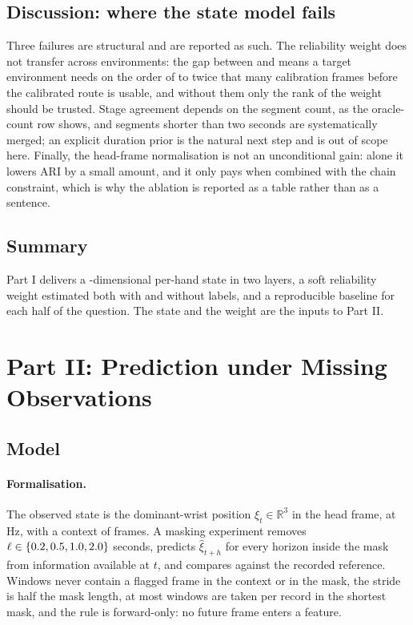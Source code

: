\documentclass{swmcmthesis}
\begin{document}
\subsection{Discussion: where the state model fails}
\label{sec:pone_discussion}
\label{sec:p1disc}

Three failures are structural and are reported as such. The reliability weight
does not transfer across environments: the gap between \slotPEnvOneAUC{} and
\slotPEnvTwoAUC{} means a target environment needs on the order of
\slotCtx{} to twice that many calibration frames before the calibrated route is
usable, and without them only the rank of the weight should be trusted. Stage
agreement depends on the segment count, as the oracle-count row shows, and
segments shorter than two seconds are systematically merged; an explicit duration
prior is the natural next step and is out of scope here. Finally, the head-frame
normalisation is not an unconditional gain: alone it lowers ARI by a small amount,
and it only pays when combined with the chain constraint, which is why the
ablation is reported as a table rather than as a sentence.

\subsection{Summary}

Part I delivers a \slotDataStateDim{}-dimensional per-hand state in two layers, a
soft reliability weight estimated both with and without labels, and a
reproducible baseline for each half of the question. The state and the weight are
the inputs to Part II.

\section{Part II: Prediction under Missing Observations}
\label{sec:parttwo}

\subsection{Model}
\label{sec:p2model}

\paragraph{Formalisation.} The observed state is the dominant-wrist position
$\xi_t\in\mathbb{R}^{3}$ in the head frame, at \slotFPS{} Hz, with a context of
\slotCtx{} frames. A masking experiment removes $\ell\in\{0.2{},
0.5{},1.0{},2.0{}\}$ seconds, predicts $\hat\xi_{t+h}$ for
every horizon inside the mask from information available at $t$, and compares
against the recorded reference. Windows never contain a flagged frame in the
context or in the mask, the stride is half the mask length, at most
\slotPTwoWinA{} windows are taken per record in the shortest mask, and the rule is
forward-only: no future frame enters a feature.
\end{document}
